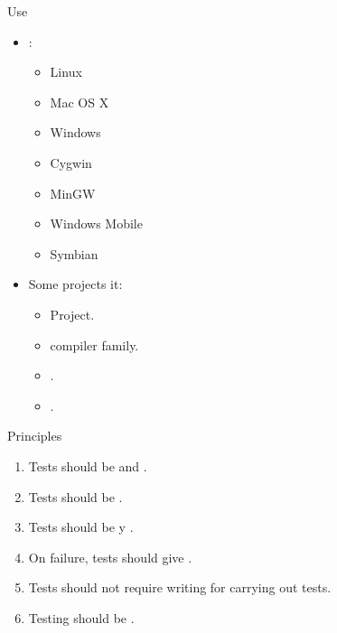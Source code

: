 \begin{frame}[t]{Use}
\begin{itemize}
  \item {}:
    \begin{itemize}
      \item Linux
      \item Mac OS X
      \item Windows
      \item Cygwin
      \item MinGW
      \item Windows Mobile
      \item Symbian
    \end{itemize}
  \vfill
  \item Some projects  it:
    \begin{itemize}
      \item {} Project.
      \item {} compiler family.
      \item {}.
      \item {}.
    \end{itemize}
\end{itemize}
\end{frame}

\begin{frame}[t]{Principles}
\begin{enumerate}
  \item Tests should be  and .
  \item Tests should be .
  \item Tests should be  y .
  \item On failure, tests should give .
  \item Tests should not require writing  for
        carrying out tests.
  \item Testing should be .
\end{enumerate}
\end{frame}

